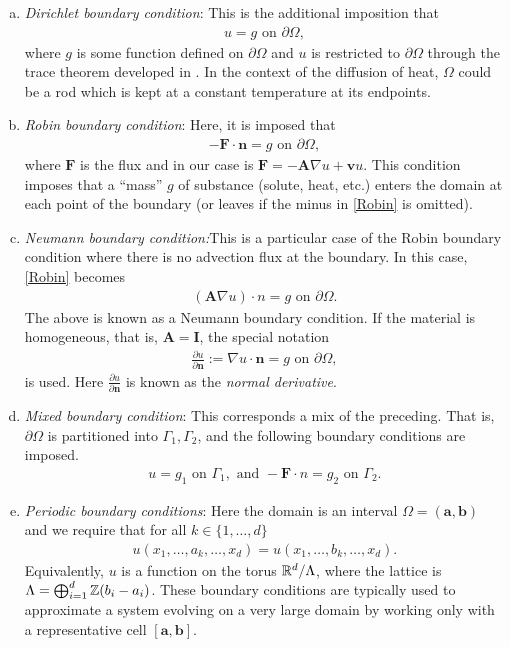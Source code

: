 \documentclass[
    a4paper,
    DIV=14,
    abstract=true,
    numbers=noenddot
]{scrartcl}
\begin{document}
\begin{enumerate}[a)]
	\item \emph{Dirichlet boundary condition}: This is the additional imposition that
	      \begin{align*}
		      u=g \text{ on } \partial\Omega,
	      \end{align*}
	      where $g$ is some function defined on  $\partial \Omega$ and $u$ is restricted to $\partial\Omega$ through the trace theorem developed in . In the context of the diffusion of heat, $\Omega$ could be a rod which is kept at a constant temperature at its endpoints.
	\item \emph{Robin boundary condition}: Here, it is imposed that
	      \begin{align}\label{Robin}
		      -\bm{F}\cdot  \bm{n} =g \text{  on } \partial \Omega,
	      \end{align}
	      where $\bm{F}$ is the flux and in our case is $\bm{F}=-\bm{A} \nabla u+ \bm{v}u$. This condition imposes that a ``mass'' $g$ of substance (solute, heat, etc.) enters the domain at each point of the boundary (or leaves if the minus in \eqref{Robin} is omitted).
	\item \emph{Neumann boundary condition:}This is a particular case of the Robin boundary condition where there is no advection flux at the boundary. In this case, \eqref{Robin}  becomes
	      \begin{align*}
		      (\bm{A} \nabla u) \cdot n=g \text{  on } \partial \Omega.
	      \end{align*}
	      The above is known as a Neumann boundary condition. If the material is homogeneous, that is, $\bm{A}=\bm{I}$, the special notation
	      \begin{align*}
		      \frac{\partial u}{\partial \bm{n}}:= \nabla u \cdot  \bm{n} =g \text{  on } \partial \Omega,
	      \end{align*}
	      is used. Here $\frac{\partial u}{\partial \bm{n}}$ is known as the \emph{normal derivative}.
	\item \emph{Mixed boundary condition}: This corresponds a mix of the preceding. That is, $\partial \Omega$ is partitioned into $\Gamma _1, \Gamma _2$, and the following boundary conditions are imposed.
	      \begin{align*}
		      u=g_1 \text{  on }  \Gamma _1,  \text{ and }  -\bm{F} \cdot n=g_2 \text{  on }  \Gamma _2.
	      \end{align*}
	\item \emph{Periodic boundary conditions}: Here the domain is an interval  $\Omega=(\bm{a}, \bm{b})$ and we require that for all $k \in \{1,\ldots,d\} $
	      \begin{align*}
		      u(x_1,\ldots,a_k,\ldots, x_d)=u({x}_1,\ldots,{b}_k,\ldots, {x}_d).
	      \end{align*}
	      Equivalently, $u$ is a function on the torus $\mathbb{R}^d/ \Lambda$, where the lattice is $\Lambda = \bigoplus_{i=1}^d \mathbb{Z}(b_i - a_i)$. These boundary conditions are typically used to approximate a system evolving on a very large domain by working only with a representative cell $[\bm{a},\bm{b}]$.
\end{enumerate}
\end{document}
